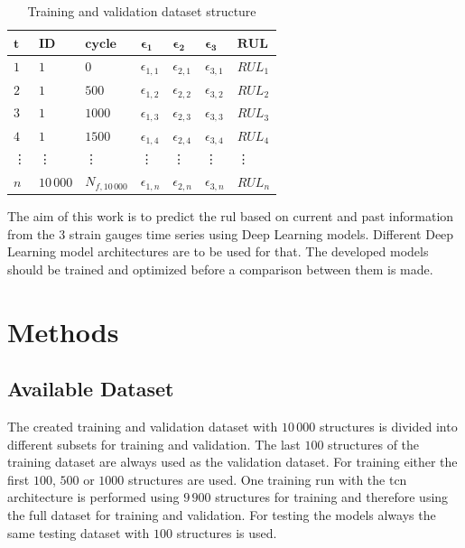 \documentclass[conference]{IEEEtran}
\begin{document}
\begin{table}[htp]
	\centering
	\caption{Training and validation dataset structure}
	\label{tab:sliding_window_approach}
	\begin{tabular}{lllllll}
		$ \boldsymbol{t} $ & $ \boldsymbol{ID} $ & $ \boldsymbol{cycle} $ & $ \boldsymbol{\epsilon_1} $     & $ \boldsymbol{\epsilon_2} $     & $ \boldsymbol{\epsilon_3} $     & $ \boldsymbol{RUL} $   \\
		\hline
		$ 1 $ & $ 1 $  & $ 0 $     & $ \epsilon_{1,1} $ & $ \epsilon_{2,1} $ &  $ \epsilon_{3,1} $ &  $ RUL_1 $ \\
		$ 2 $ & $ 1 $  & $ 500 $   & $ \epsilon_{1,2} $ & $ \epsilon_{2,2} $ & $ \epsilon_{3,2} $ & $ RUL_2 $ \\
		$ 3 $ & $ 1 $  & $ 1000 $  & $ \epsilon_{1,3} $ & $ \epsilon_{2,3} $ & $ \epsilon_{3,3} $ & $ RUL_3 $ \\
		$ 4 $ & $ 1 $  & $ 1500 $  & $ \epsilon_{1,4} $ & $ \epsilon_{2,4} $ & $ \epsilon_{3,4} $ & $ RUL_4 $ \\
		\vdots & \vdots & \vdots & \vdots & \vdots &\vdots & \vdots \\
		$ n $ & $ 10\,000 $  & $ N_{f,10\,000} $  & $ \epsilon_{1,n} $ & $ \epsilon_{2,n} $ & $ \epsilon_{3,n} $ & $ RUL_n $
	\end{tabular}
\end{table}

The aim of this work is to predict the \gls{rul} based on current and past information from the 3 strain gauges time series using Deep Learning models. Different Deep Learning model architectures are to be used for that. The developed models should be trained and optimized before a comparison between them is made.

\section{Methods}
\label{sec:methods}

\subsection{Available Dataset}
\label{sec:available_dataset}

The created training and validation dataset with $ 10\,000 $ structures is divided into different subsets for training and validation. The last $ 100 $ structures of the training dataset are always used as the validation dataset. For training either the first $ 100 $, $ 500 $ or $ 1000 $ structures are used. One training run with the \gls{tcn} architecture is performed using $ 9\,900 $ structures for training and therefore using the full dataset for training and validation. For testing the models always the same testing dataset with $ 100 $ structures is used.
\end{document}
